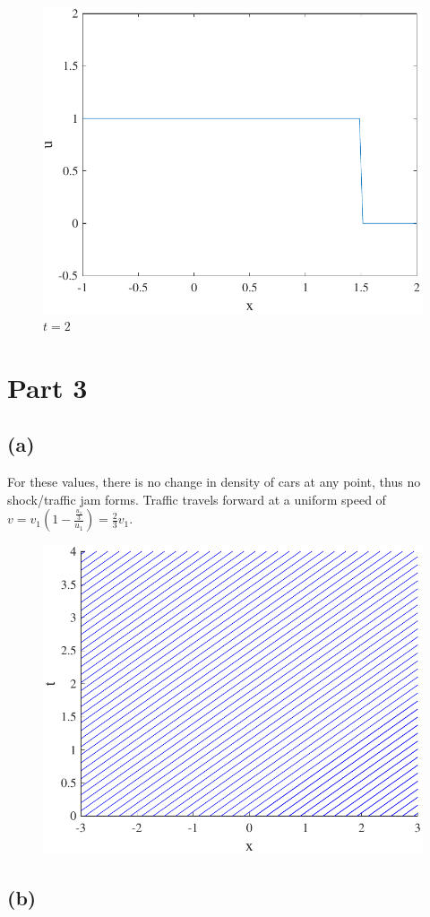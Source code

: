 \documentclass{article}
\begin{document}
\begin{figure}[!htbp]
  \centering
    \includegraphics[width=.49\textwidth]{hw_14_plot13.pdf}
    \caption{$t = 2$}
\end{figure}
\section*{Part 3}
\subsection*{(a)}
For these values, there is no change in density of cars at any point, thus no shock/traffic jam forms. Traffic travels forward at a uniform speed of $v = v_1(1 - \frac{\frac{u_1}{3}}{u_1}) = \frac{2}{3}v_1$. 
\begin{figure}[!htbp]
  \centering
    \includegraphics[width=.49\textwidth]{hw_14_plot14.pdf}
    \caption{}
\end{figure}
\subsection*{(b)}
\end{document}
